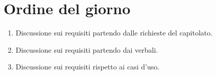\section{Ordine del giorno}

\begin{enumerate}
    \item Discussione sui requisiti partendo dalle richieste del capitolato.
    \item Discussione sui requisiti partendo dai verbali.
    \item Discussione sui requisiti rispetto ai casi d'uso.
\end{enumerate}
